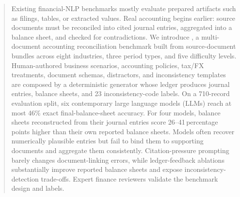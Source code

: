 \begin{abstract}
Existing financial-NLP benchmarks mostly evaluate prepared artifacts such as filings, tables, or extracted values. Real accounting begins earlier: source documents must be reconciled into cited journal entries, aggregated into a balance sheet, and checked for contradictions. We introduce \benchmark{}, a multi-document accounting reconciliation benchmark built from source-document bundles across eight industries, three period types, and five difficulty levels. Human-authored business scenarios, accounting policies, tax/FX treatments, document schemas, distractors, and inconsistency templates are composed by a deterministic generator whose ledger produces journal entries, balance sheets, and 23 inconsistency-code labels. On a 710-record evaluation split, six contemporary large language models (LLMs) reach at most 46\% exact final-balance-sheet accuracy. For four models, balance sheets reconstructed from their journal entries score 26--41\,percentage points higher than their own reported balance sheets. Models often recover numerically plausible entries but fail to bind them to supporting documents and aggregate them consistently. Citation-pressure prompting barely changes document-linking errors, while ledger-feedback ablations substantially improve reported balance sheets and expose inconsistency-detection trade-offs. Expert finance reviewers validate the benchmark design and labels.
\end{abstract}
